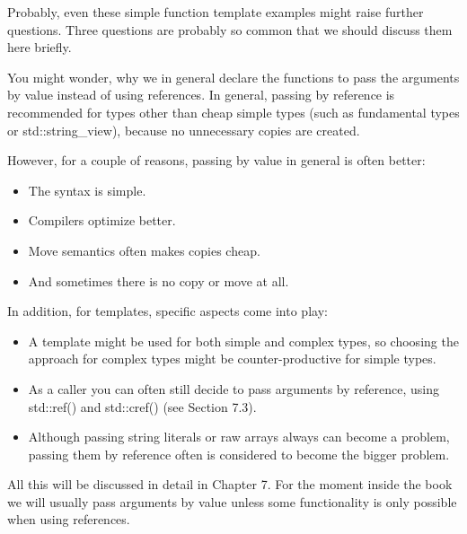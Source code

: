 Probably, even these simple function template examples might raise further questions. Three questions are probably so common that we should discuss them here briefly.


You might wonder, why we in general declare the functions to pass the arguments by value instead of using references. In general, passing by reference is recommended for types other than cheap simple types (such as fundamental types or std::string\_view), because no unnecessary copies are created.

However, for a couple of reasons, passing by value in general is often better:

\begin{itemize}
\item
The syntax is simple.

\item 
Compilers optimize better.

\item
Move semantics often makes copies cheap.

\item 
And sometimes there is no copy or move at all.
\end{itemize}

In addition, for templates, specific aspects come into play:

\begin{itemize}
\item
A template might be used for both simple and complex types, so choosing the approach for complex types might be counter-productive for simple types.

\item 
As a caller you can often still decide to pass arguments by reference, using std::ref() and std::cref() (see Section 7.3).

\item
Although passing string literals or raw arrays always can become a problem, passing them by reference often is considered to become the bigger problem.
\end{itemize}

All this will be discussed in detail in Chapter 7. For the moment inside the book we will usually pass arguments by value unless some functionality is only possible when using references.

 
